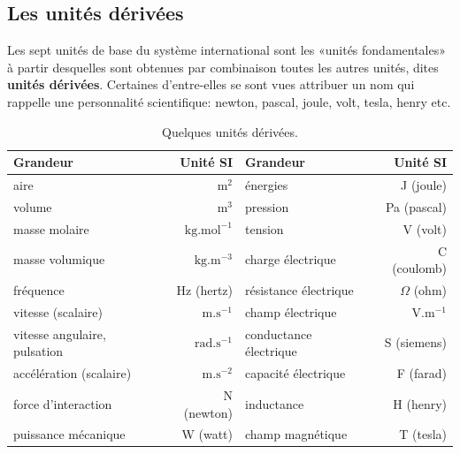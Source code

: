 %	
%	
%	
%


\subsection{Les unités dérivées}
Les sept unités de base du système international sont les «unités fondamentales» à partir desquelles sont obtenues par combinaison toutes les autres unités, dites \textbf{unités dérivées}. Certaines d'entre-elles se sont vues attribuer un nom qui rappelle une personnalité scientifique: newton, pascal, joule, volt, tesla, henry etc.
\begin{table}[htbp]
	\caption{Quelques unités dérivées.}
	\footnotesize
	\begin{tabular}{lrlr}
	\toprule
	\textbf{Grandeur}					&\textbf{Unité SI}
	&
	\textbf{Grandeur}					&\textbf{Unité SI} \\
	\midrule
	aire								& $\mathrm{m^{2}}$ 
	&énergies 							& J	(joule)\\	

	volume								& $\mathrm{m^{3}}$  
	&pression							& Pa (pascal)\\

	masse molaire						& $\mathrm{kg.mol^{-1}}$ 
	&tension								& V (volt)\\

	masse volumique 					& $\mathrm{kg.m^{-3}}$ 
	&charge électrique					& C (coulomb)\\

	fréquence							& Hz (hertz)
	&résistance électrique				& $\Omega$ (ohm)\\

	vitesse (scalaire)					& $\mathrm{m.s^{-1}}$ 
	&champ électrique					& $\mathrm{V.m^{-1}}$\\

	vitesse angulaire, pulsation		& $\mathrm{rad.s^{-1}}$ 
	&conductance électrique				& S (siemens)\\

	accélération (scalaire) 			& $\mathrm{m.s^{-2}}$ 
	&capacité électrique					& F (farad)\\

	force d'interaction 				& N (newton)
	&inductance							& H (henry)\\

	puissance mécanique					& W (watt)	
	&champ magnétique					& T (tesla)\\	   
	\bottomrule
	\end{tabular}
\end{table}
